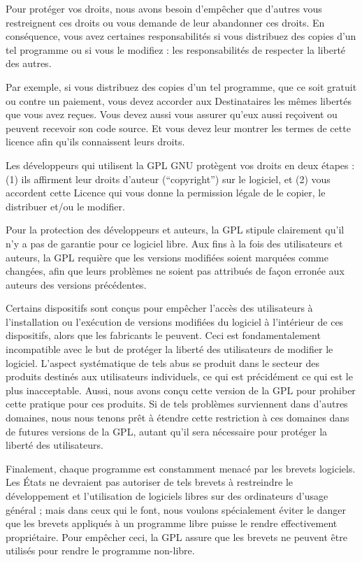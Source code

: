 {  Pour protéger vos droits, nous avons besoin d’empêcher que d’autres
vous restreignent ces droits ou vous demande de leur abandonner ces
droits. En conséquence, vous avez certaines responsabilités si vous
distribuez des copies d’un tel programme ou si vous le modifiez :
les responsabilités de respecter la liberté des autres.

  Par exemple, si vous distribuez des copies d’un tel programme, que ce
soit gratuit ou contre un paiement, vous devez accorder aux
Destinataires les mêmes libertés que vous avez reçues. Vous devez aussi
vous assurer qu’eux aussi reçoivent ou peuvent recevoir son code
source. Et vous devez leur montrer les termes de cette licence afin
qu’ils connaissent leurs droits.

  Les développeurs qui utilisent la GPL GNU protègent vos droits en deux
étapes : (1) ils affirment leur droits d’auteur (“copyright”) sur le
logiciel, et (2) vous accordent cette Licence qui vous donne la
permission légale de le copier, le distribuer et/ou le modifier.

  Pour la protection des développeurs et auteurs, la GPL stipule
clairement qu’il n’y a pas de garantie pour ce logiciel libre. Aux fins
à la fois des utilisateurs et auteurs, la GPL requière que les versions
modifiées soient marquées comme changées, afin que leurs problèmes ne
soient pas attribués de façon erronée aux auteurs des versions
précédentes.

  Certains dispositifs sont conçus pour empêcher l’accès des utilisateurs
à l’installation ou l’exécution de versions modifiées du logiciel à
l’intérieur de ces dispositifs, alors que les fabricants le peuvent.
Ceci est fondamentalement incompatible avec le but de protéger la
liberté des utilisateurs de modifier le logiciel. L’aspect systématique
de tels abus se produit dans le secteur des produits destinés aux
utilisateurs individuels, ce qui est précidément ce qui est le plus
inacceptable. Aussi, nous avons conçu cette version de la GPL pour
prohiber cette pratique pour ces produits. Si de tels problèmes
surviennent dans d’autres domaines, nous nous tenons prêt à étendre
cette restriction à ces domaines dans de futures versions de la GPL,
autant qu’il sera nécessaire pour protéger la liberté des utilisateurs.

  Finalement, chaque programme est constamment menacé par les brevets
logiciels. Les États ne devraient pas autoriser de tels brevets à
restreindre le développement et l’utilisation de logiciels libres sur
des ordinateurs d’usage général ; mais dans ceux qui le font, nous
voulons spécialement éviter le danger que les brevets appliqués à un
programme libre puisse le rendre effectivement propriétaire. Pour
empêcher ceci, la GPL assure que les brevets ne peuvent être utilisés
pour rendre le programme non-libre.

}
